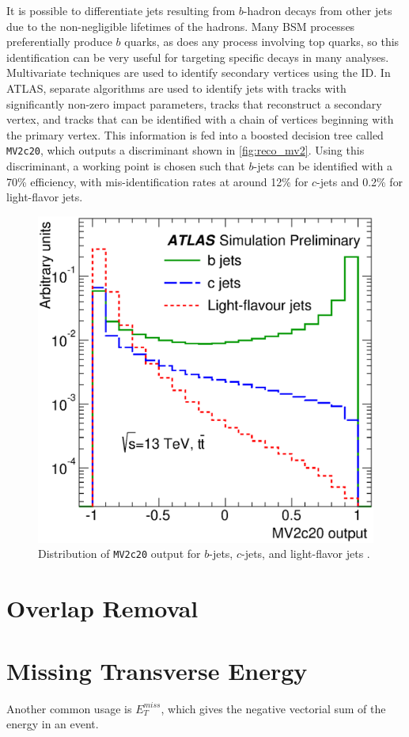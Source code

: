 It is possible to differentiate jets resulting from $b$-hadron decays from other jets due to the non-negligible lifetimes of the hadrons. Many \ac{BSM} processes preferentially produce $b$ quarks, as does any process involving top quarks, so this identification can be very useful for targeting specific decays in many analyses. Multivariate techniques are used to identify secondary vertices using the \ac{ID}\cite{ATL-PHYS-PUB-2015-022}. In ATLAS, separate algorithms are used to identify jets with tracks with significantly non-zero impact parameters, tracks that reconstruct a secondary vertex, and tracks that can be identified with a chain of vertices beginning with the primary vertex. This information is fed into a boosted decision tree called \texttt{MV2c20}, which outputs a discriminant shown in \autoref{fig:reco_mv2}. Using this discriminant, a working point is chosen such that $b$-jets can be identified with a 70\% efficiency, with mis-identification rates at around 12\% for $c$-jets and 0.2\% for light-flavor jets.

\begin{centering}
\begin{figure}[!hbt]
\myfloatalign
\includegraphics[width=.9\linewidth]{figures/reco/fig_08.eps}
\caption{ Distribution of \texttt{MV2c20} output for $b$-jets, $c$-jets, and light-flavor jets \cite{ATL-PHYS-PUB-2015-022}. }
\label{fig:reco_mv2}
\end{figure}
\end{centering}

\section{Overlap Removal}
\label{sec:reco_or}



\section{Missing Transverse Energy}
\label{sec:reco_met}

Another common usage is $E_T^{miss}$, which gives the negative vectorial sum of the energy in an event. 



